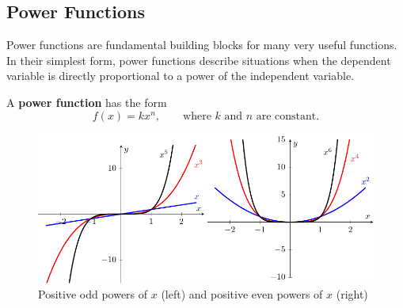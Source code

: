 

\subsection*{Power Functions}

Power functions are fundamental building blocks for many very useful functions.  In their simplest form, power functions describe situations when the dependent variable is directly proportional to a power of the independent variable.

\begin{definition}
A {\bf power function} has the form
	\[ 
		f(x) = kx^{n}, \qquad \mbox{where } k \mbox{ and } n \mbox{ are constant.}
	\]
\end{definition}


\begin{figure}[ht!]
	\begin{center}
        \includegraphics[width=0.9\columnwidth]{figures/0-6-fig2.pdf}
	\end{center}     
\caption{Positive odd powers of $x$ (left) and positive even powers of $x$ (right)}     
\label{F:0.6.Ex1} 
\end{figure}

